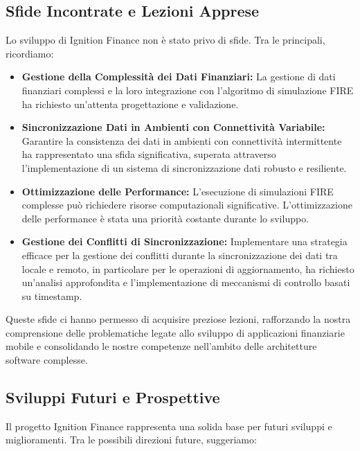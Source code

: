 \subsection*{Sfide Incontrate e Lezioni Apprese}

Lo sviluppo di Ignition Finance non è stato privo di sfide.
Tra le principali,
ricordiamo:

\begin{itemize}
    \item \textbf{Gestione della Complessità dei Dati Finanziari:} La gestione
    di dati finanziari complessi e la loro integrazione con l'algoritmo di
    simulazione FIRE ha richiesto un'attenta progettazione e validazione.
    \item \textbf{Sincronizzazione Dati in Ambienti con Connettività Variabile:}
    Garantire la consistenza dei dati in ambienti con connettività intermittente
    ha rappresentato una sfida significativa, superata attraverso
    l'implementazione di un sistema di sincronizzazione dati robusto e
    resiliente.
    \item \textbf{Ottimizzazione delle Performance:} L'esecuzione di simulazioni
    FIRE complesse può richiedere risorse computazionali significative.
    L'ottimizzazione delle performance è stata una priorità costante durante lo
    sviluppo.
    \item \textbf{Gestione dei Conflitti di Sincronizzazione:} Implementare una
    strategia efficace per la gestione dei conflitti durante la sincronizzazione
    dei dati tra locale e remoto, in particolare per le operazioni di
    aggiornamento, ha richiesto un'analisi approfondita e l'implementazione di
    meccanismi di controllo basati su timestamp.
\end{itemize}

Queste sfide ci hanno permesso di acquisire preziose lezioni, rafforzando la
nostra comprensione delle problematiche legate allo sviluppo di applicazioni
finanziarie mobile e consolidando le nostre competenze nell'ambito delle
architetture software complesse.

\subsection*{Sviluppi Futuri e Prospettive}

Il progetto Ignition Finance rappresenta una solida base per futuri sviluppi e
miglioramenti.
Tra le possibili direzioni future, suggeriamo:

